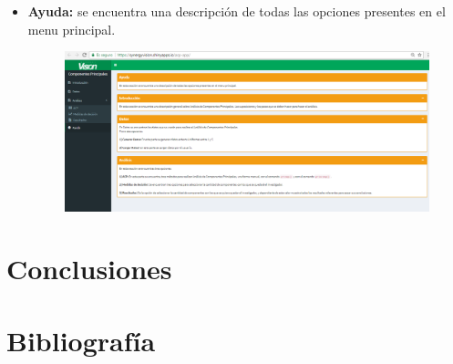 \documentclass[12pt,letterpaper]{report} %
\begin{document}
\begin{itemize}
\newpage

\item \textbf{Ayuda:} se encuentra una descripción de todas las opciones presentes en el menu principal.

\begin{figure}[H]
\begin{center}
\includegraphics[width=15 cm,height=10 cm]{img/Ayuda.png}
\end{center}
\end{figure}

\end{itemize}

\chapter{Conclusiones}

\chapter{Bibliografía}
\end{document}
